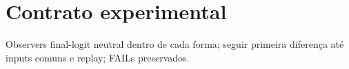 \section{Contrato experimental}
Observers final-logit neutral dentro de cada forma; seguir primeira diferença até inputs comuns e replay; FAILs preservados.
